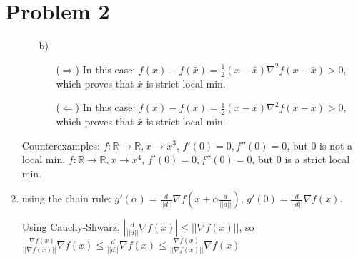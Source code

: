 \documentclass[12pt]{article}
\newenvironment{problem}[1]
{\section*{Problem #1}}{}
\begin{document}
\begin{problem}{2}
\begin{enumerate}
\begin{enumerate}
    \item[b)]
      \begin{enumerate}
      \item[($\Rightarrow$)]
        In this case: $f(x) - f(\bar x) = \frac12 (x-\bar x) \nabla^2 f(x - \bar x) > 0$, which proves that $\bar x$ is strict local min.
      \item[($\Leftarrow$)]
        In this case: $f(x) - f(\bar x) = \frac12 (x-\bar x) \nabla^2 f(x - \bar x) > 0$, which proves that $\bar x$ is strict local min.
      \end{enumerate}
    \end{enumerate}

    Counterexamples:
    $f: \mathbb R \rightarrow \mathbb R, x \rightarrow x^3$, $f'(0) = 0, f''(0) = 0$, but $0$ is not a local min.
    $f: \mathbb R \rightarrow \mathbb R, x \rightarrow x^4$, $f'(0) = 0, f''(0) = 0$, but $0$ is a strict local min.
  \item using the chain rule: $g'(\alpha) = \frac{d}{||d||} \nabla f(x + \alpha \frac{d}{||d||})$, $g'(0) = \frac{d}{||d||}\nabla f(x)$.
    

    Using Cauchy-Shwarz, $|\frac{d}{||d||}\nabla f(x)| \le ||\nabla f(x)||$, so
    $\frac{-\nabla f(x)}{||\nabla f(x)||}\nabla f(x) \le \frac{d}{||d||}\nabla f(x) \le \frac{\nabla f(x)}{||\nabla f(x)||}\nabla f(x)$
    
  \end{enumerate}

\end{problem}
\end{document}
